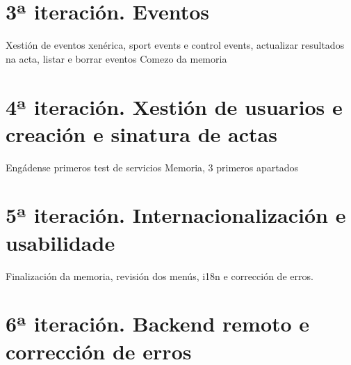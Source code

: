   \section{3ª iteración. Eventos}
  Xestión de eventos xenérica, sport events e control events, actualizar resultados na 
acta, listar e borrar eventos
  Comezo da memoria
  
  \section{4ª iteración. Xestión de usuarios e creación e sinatura de actas}
  Engádense primeros test de servicios
  Memoria, 3 primeros apartados
  
  \section{5ª iteración. Internacionalización e usabilidade}
  Finalización da memoria, revisión dos menús, i18n e corrección de erros.

  \section{6ª iteración. Backend remoto e corrección de erros}
  

